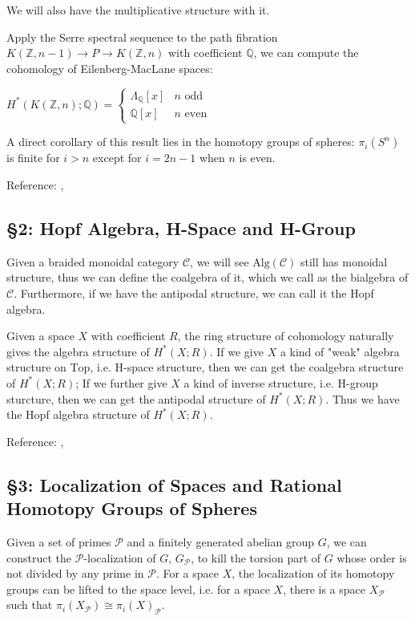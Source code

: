 \documentclass[12pt, reqno]{amsart}
\theoremstyle{definition}
\theoremstyle{remark}
\numberwithin{equation}{section}
\begin{document}
{We will also have the multiplicative structure with it.

Apply the Serre spectral sequence to the path fibration $K(\mathbb{Z}, n-1) \to P \to K(\mathbb{Z}, n)$ with coefficient $\mathbb{Q}$, we can compute the cohomology of Eilenberg-MacLane spaces: 

$H^*(K(\mathbb{Z}, n); \mathbb{Q}) = \begin{cases}\Lambda_{\mathbb{Q}}[x] & n \text{ odd}\\
\mathbb{Q}[x] & n \text{ even}\end{cases}$

A direct corollary of this result lies in the homotopy groups of spheres: $\pi_i(S^n)$ is finite for $i>n$ except for $i=2n-1$ when $n$ is even.

Reference: \cite{HatSS}, \cite{May11}

\subsection*{\textbf{§2: Hopf Algebra, H-Space and H-Group}}

Given a braided monoidal category $\mathcal{C}$, we will see $\mathrm{Alg}(\mathcal{C})$ still has monoidal structure, thus we can define the coalgebra of it, which we call as the bialgebra of $\mathcal{C}$. Furthermore, if we have the antipodal structure, we can call it the Hopf algebra.

Given a space $X$ with coefficient $R$, the ring structure of cohomology naturally gives the algebra structure of $H^*(X; R)$. If we give $X$ a kind of "weak" algebra structure on $\mathrm{Top}$, i.e. H-space structure, then we can get the coalgebra structure of $H^*(X; R)$; If we further give $X$ a kind of inverse structure, i.e. H-group sturcture, then we can get the antipodal structure of $H^*(X; R)$. Thus we have the Hopf algebra structure of $H^*(X; R)$.

Reference: \cite{OAMM}, \cite{Hat02}

\subsection*{\textbf{§3: Localization of Spaces and Rational Homotopy Groups of Spheres}}

Given a set of primes $\mathcal{P}$ and a finitely generated abelian group $G$, we can construct the $\mathcal{P}$-localization of $G$, $G_{\mathcal{P}}$, to kill the torsion part of $G$ whose order is not divided by any prime in $\mathcal{P}$. For a space $X$, the localization of its homotopy groups can be lifted to the space level, i.e. for a space $X$, there is a space $X_{\mathcal{P}}$ such that $\pi_i(X_{\mathcal{P}}) \cong \pi_i(X)_{\mathcal{P}}$. 

}
\end{document}
